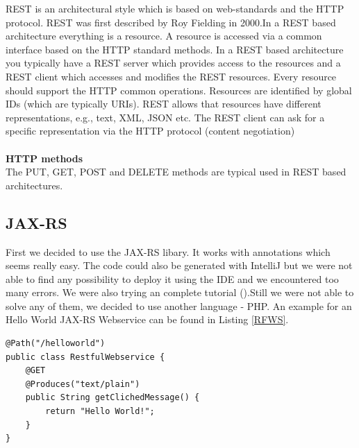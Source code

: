 \documentclass[12pt]{article}
\begin{document}
REST is an architectural style which is based on web-standards and the HTTP protocol. REST was first described by Roy Fielding in 2000.In a REST based architecture everything is a resource. A resource is accessed via a common interface based on the HTTP standard methods. In a REST based architecture you typically have a REST server which provides access to the resources and a REST client which accesses and modifies the REST resources. Every resource should support the HTTP common operations. Resources are identified by global IDs (which are typically URIs). REST allows that resources have different representations, e.g., text, XML, JSON etc. The REST client can ask for a specific representation via the HTTP protocol (content negotiation)  \cite{vogella}
\\\\
\textbf{HTTP methods} \\
The PUT, GET, POST and DELETE methods are typical used in REST based architectures.
 \cite{vogella}
\subsection{JAX-RS}
First we decided to use the JAX-RS libary. It works with annotations which seems really easy.
The code could also be generated with IntelliJ but we were not able to find any possibility to deploy it using the IDE and we encountered too many errors. We were also trying an complete tutorial (\cite{vogella}).Still we were not able to solve any of them, we decided to use another language - PHP. An example for an Hello World JAX-RS Webservice can be found in Listing \ref{RFWS}.
\begin{lstlisting}[caption=Restful Webservice, label=RFWS]
@Path("/helloworld")
public class RestfulWebservice {
    @GET
    @Produces("text/plain")
    public String getClichedMessage() {
        return "Hello World!";
    }
}
\end{lstlisting}
\newpage
\end{document}
